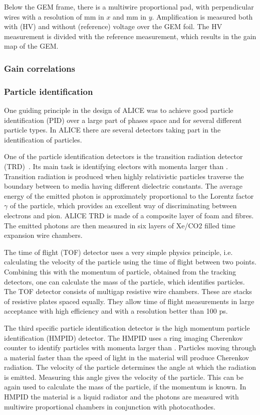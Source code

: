 Below the GEM frame, there is a multiwire proportional pad, with perpendicular wires with a resolution of \unit[4]{mm} in $x$ and \unit[3]{mm} in $y$. Amplification is measured both with (HV) and without (reference) voltage over the GEM foil. The HV measurement is divided with the reference measurement, which results in the gain map of the GEM.

\subsubsection*{Gain correlations}

\subsubsection{Particle identification}
One guiding principle in the design of ALICE was to achieve good particle identification (PID) over  a large part of phases space and for several different particle types. In ALICE there are several detectors taking part in the identification of particles. 

One of the particle identification detectors is the transition radiation detector (TRD)~\cite{trd}. Its main task is identifying electors with momenta larger than \unit[1]{\gev}. Transition radiation is produced when highly relativistic particles traverse the boundary between to media having different dielectric constants. The average energy of the emitted photon is approximately proportional to the Lorentz factor $\gamma$ of the particle, which provides an excellent way of discriminating between electrons and pion. ALICE TRD is made of a composite layer of foam and fibres. The emitted photons are then measured in six layers of Xe/CO2 filled time expansion wire chambers. 

The time of flight  (TOF) detector uses a very simple physics principle, i.e. calculating the velocity of the particle using the time of flight between two points. Combining this with the momentum of particle, obtained from the tracking detectors, one can calculate the mass of the particle, which identifies particles. The TOF detector consists of multigap resistive wire chambers. These are stacks of resistive plates spaced equally. They allow time of flight measurements in large acceptance with high efficiency and with a resolution better than 100 ps. 

The third specific particle identification detector is the high momentum particle identification (HMPID) detector. The HMPID uses a ring imaging Cherenkov counter to identify particles with momenta larger than \unit[1]{\gev}. Particles moving through a material faster than the speed of light in the material will produce Cherenkov radiation. The velocity of the particle determines the angle at which the radiation is emitted. Measuring this angle gives the velocity of the particle. This can be again used to calculate the mass of the particle, if the momentum is known. In HMPID the material is a liquid radiator and the photons are measured with multiwire proportional chambers in conjunction with photocathodes. 

